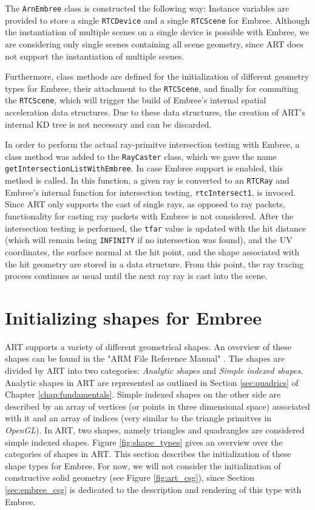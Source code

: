 The \texttt{ArnEmbree} class is constructed the following way: Instance variables are provided to store a single \texttt{RTCDevice} and a single \texttt{RTCScene} for Embree. Although the instantiation of multiple scenes on a single device is possible with Embree, we are considering only single scenes containing all scene geometry, since ART does not support the instantiation of multiple scenes. 

Furthermore, class methods are defined for the initialization of different geometry types for Embree, their attachment to the \texttt{RTCScene}, and finally for commiting the \texttt{RTCScene}, which will trigger the build of Embree's internal spatial acceleration data structures. Due to these data structures, the creation of ART's internal KD tree is not necessary and can be discarded.

In order to perform the actual ray-primitve intersection testing with Embree, a class method was added to the \texttt{RayCaster} class, which we gave the name \texttt{getIntersectionListWithEmbree}. In case Embree support is enabled, this method is called. In this function, a given ray is converted to an \texttt{RTCRay} and Embree's internal function for intersection testing, \texttt{rtcIntersect1}, is invoced. Since ART only supports the cast of single rays, as opposed to ray packets, functionality for casting ray packets with Embree is not considered. After the intersection testing is performed, the \texttt{tfar} value is updated with the hit distance (which will remain being \texttt{INFINITY} if no intersection was found), and the UV coordinates, the surface normal at the hit point, and the shape associated with the hit geometry are stored in a   data structure. From this point, the ray tracing process continues as usual until the next ray ray is cast into the scene.

\section{Initializing shapes for Embree}

ART supports a variety of different geometrical shapes. An overview of these shapes can be found in the "ARM File Reference Manual" \cite{artreferencemanual}. The shapes are divided by ART into two categories: \emph{Analytic shapes} and \emph{Simple indexed shapes}. Analytic shapes in ART are represented as outlined in Section \ref{sec:quadrics} of Chapter \ref{chap:fundamentals}. Simple indexed shapes on the other side are described by an array of vertices (or points in three dimensional space) associated with it and an array of indices (very similar to the triangle primitves in \emph{OpenGL}). In ART, two shapes, namely triangles and quadrangles are considered simple indexed shapes. Figure \ref{fig:shape_types} gives an overview over the categories of shapes in ART. This section describes the initialization of these shape types for Embree. For now, we will not consider the initialization of constructive solid geometry (see Figure \ref{fig:art_csg}), since Section \ref{sec:embree_csg} is dedicated to the description and rendering of this type with Embree.

